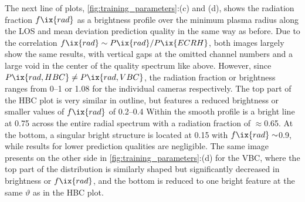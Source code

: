         The next line of plots, \cref{fig:training_parameters}:(c) and (d), shows the radiation fraction $f\ix{rad}$ as a brightness profile over the minimum plasma radius along the LOS and mean deviation prediction quality in the same way as before. Due to the correlation $f\ix{rad}\sim P\ix{rad}/P\ix{ECRH}$, both images largely show the same results, with vertical gaps at the omitted channel numbers and a large void in the center of the quality spectrum like above. However, since $P\ix{rad,HBC}\neq P\ix{rad,VBC}$, the radiation fraction or brightness ranges from \SIrange{0}{1}{\arbitraryunit} or \SI{1.08}{\arbitraryunit} for the individual cameras respectively. The top part of the HBC plot is very similar in outline, but features a reduced brightness or smaller values of $f\ix{rad}$ of \SIrange{0.2}{0.4}{\arbitraryunit} Within the smooth profile is a bright line at \SI{0.75}{\arbitraryunit} across the entire radial spectrum with a radiation fraction of $\approx$\SI{0.65}{\arbitraryunit}. At the bottom, a singular bright structure is located at \SI{0.15}{\arbitraryunit} with $f\ix{rad}\sim$\SI{0.9}{\arbitraryunit}, while results for lower prediction qualities are negligible. The same image presents on the other side in \cref{fig:training_parameters}:(d) for the VBC, where the top part of the distribution is similarly shaped but significantly decreased in brightness or $f\ix{rad}$, and the bottom is reduced to one bright feature at the same $\vartheta$ as in the HBC plot.\\%
